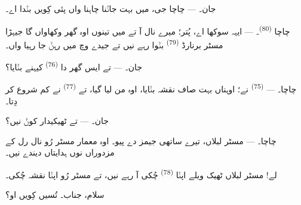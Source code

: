 %
%
%

\VUsaut{6.0mm}
\VUsaut{1.4mm}
\VUsaut{2.2mm}

\VUsaut{3.0mm}

\textsc{جان}۔ --- چاچا جی، میں بہت جاݨنا چاہنا واں پئی  کِویں بݨدا
اے۔

\textsc{چاچا} \textsuperscript{(80)}۔ --- ایہہ سوکھا اے، پُتر؛ میرے نال آ تے میں
تینوں اوہ گھر وکھاواں گا جیہڑا مسٹر برنارڈ \textsuperscript{(79)} بݨوا رہے نیں تے
جیدے وچ میں رہݨ جا رہیا واں۔

\textsc{جان}۔ --- تے ایس گھر دا  \textsuperscript{(76)} کیہنے بݨایا؟

\textsc{چاچا}۔ ---  \textsuperscript{(75)} نے؛ اوہناں بہت صاف نقشہ
بݨایا، اوہ من لیا گیا، تے  \textsuperscript{(77)} نے کم شروع کر
دِتا۔

\textsc{جان}۔ --- تے ٹھیکیدار کوݨ نیں؟

\textsc{چاچا}۔ --- مسٹر لبلاں، تیرے ساتھی جیمز دے پیو۔ اوہ معمار مسٹر رُو نال رل
کے مزدوراں نوں ہدایتاں دیندے نیں۔

لے! مسٹر لبلاں ٹھیک ویلے اپݨا  \textsuperscript{(78)} چُکی آ رہے
نیں، تے مسٹر رُو اپݨا نقشہ چُکی۔

سلام، جناب۔ تُسیں کِویں او؟

